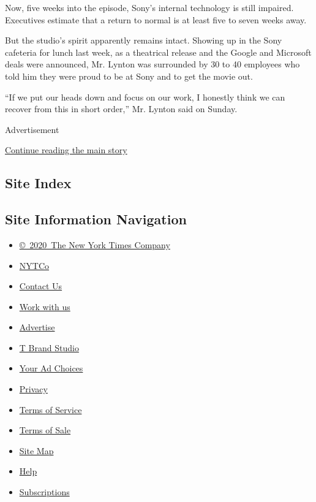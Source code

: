 Now, five weeks into the episode, Sony's internal technology is still
impaired. Executives estimate that a return to normal is at least five
to seven weeks away.

But the studio's spirit apparently remains intact. Showing up in the
Sony cafeteria for lunch last week, as a theatrical release and the
Google and Microsoft deals were announced, Mr. Lynton was surrounded by
30 to 40 employees who told him they were proud to be at Sony and to get
the movie out.

``If we put our heads down and focus on our work, I honestly think we
can recover from this in short order,'' Mr. Lynton said on Sunday.

Advertisement

\protect\hyperlink{after-bottom}{Continue reading the main story}

\hypertarget{site-index}{%
\subsection{Site Index}\label{site-index}}

\hypertarget{site-information-navigation}{%
\subsection{Site Information
Navigation}\label{site-information-navigation}}

\begin{itemize}
\tightlist
\item
  \href{https://help.nytimes.com/hc/en-us/articles/115014792127-Copyright-notice}{©~2020~The
  New York Times Company}
\end{itemize}

\begin{itemize}
\tightlist
\item
  \href{https://www.nytco.com/}{NYTCo}
\item
  \href{https://help.nytimes.com/hc/en-us/articles/115015385887-Contact-Us}{Contact
  Us}
\item
  \href{https://www.nytco.com/careers/}{Work with us}
\item
  \href{https://nytmediakit.com/}{Advertise}
\item
  \href{http://www.tbrandstudio.com/}{T Brand Studio}
\item
  \href{https://www.nytimes.com/privacy/cookie-policy\#how-do-i-manage-trackers}{Your
  Ad Choices}
\item
  \href{https://www.nytimes.com/privacy}{Privacy}
\item
  \href{https://help.nytimes.com/hc/en-us/articles/115014893428-Terms-of-service}{Terms
  of Service}
\item
  \href{https://help.nytimes.com/hc/en-us/articles/115014893968-Terms-of-sale}{Terms
  of Sale}
\item
  \href{https://spiderbites.nytimes.com}{Site Map}
\item
  \href{https://help.nytimes.com/hc/en-us}{Help}
\item
  \href{https://www.nytimes.com/subscription?campaignId=37WXW}{Subscriptions}
\end{itemize}
